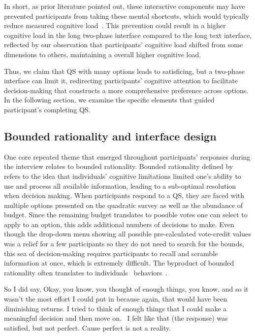 In short, as prior literature pointed out, these interactive components may have prevented participants from taking these mental shortcuts, which would typically reduce measured cognitive load~\cite{daniel2017thinking, simonBehavioralModelRational1955, payneAdaptiveStrategySelection1988, tverskyJudgmentsRepresentativeness}. This prevention could result in a higher cognitive load in the long two-phase interface compared to the long text interface, reflected by our observation that participants' cognitive load shifted from some dimensions to others, maintaining a overall higher cognitive load.

Thus, we claim that QS with many options leads to satisficing, but a two-phase interface can limit it, redirecting participants' cognitive attention to facilitate decision-making that constructs a more comprehensive preference across options. In the following section, we examine the specific elements that guided participant's completing QS.


\subsection{Bounded rationality and interface design}
One core repeated theme that emerged throughout participants' responses during the interview relates to bounded rationality. Bounded rationality defined by~\textcite{simonBehavioralModelRational1955} refers to the idea that individuals' cognitive limitations limited one's ability to use and process all available information, leading to a sub-optimal resolution when decision making. When participants respond to a QS, they are faced with multiple options presented on the quadratic survey as well as the abundance of budget. Since the remaining budget translates to possible votes one can select to apply to an option, this adds additional numbers of decisions to make. Even though the drop-down menu showing all possible pre-calculated vote-credit values was a relief for a few participants so they do not need to search for the bounds, this sea of decision-making requires participants to recall and scramble information at once, which is extremely difficult. The byproduct of bounded rationality often translates to individuals~\underline{} behaviors~\cite{gigerenzerReasoningFastFrugal1996}.

\begin{displayquote}
So I did say, Okay, you know, you thought of enough things, you know, and so it wasn't the most effort I could put in because again, that would have been diminishing returns. I tried to think of enough things that I could make a meaningful decision and then move on.~\bracketellipsis 
I felt like that (the response) was satisfied, but not perfect. Cause perfect is not a reality. \hfill{}
\end{displayquote}

